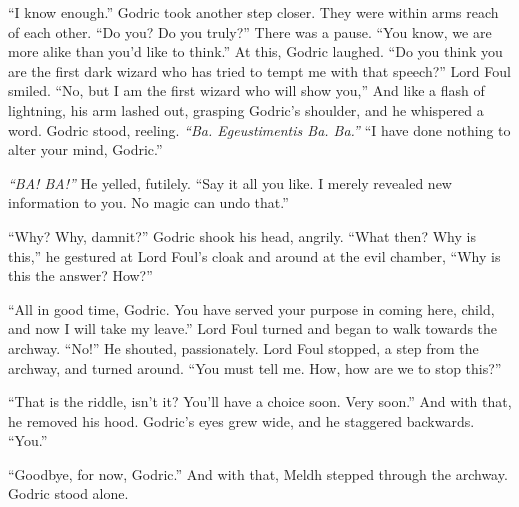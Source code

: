 “I know enough.” Godric took another step closer. They were within arms reach of each other.
\SmallVSpace
“Do you? Do you truly?” There was a pause. “You know, we are more alike than you’d like to think.”
\SmallVSpace
At this, Godric laughed. “Do you think you are the first dark wizard who has tried to tempt me with that speech?”
\SomeVSpace
Lord Foul smiled. “No, but I am the first wizard who will show you,” And like a flash of lightning, his arm lashed out, grasping Godric’s shoulder, and he whispered a word.
\simpleline
Godric stood, reeling. \emph{“Ba. Egeustimentis Ba. Ba.”}
\SomeVSpace
“I have done nothing to alter your mind, Godric.”

\emph{“BA! BA!”} He yelled, futilely.
\SmallVSpace
“Say it all you like. I merely revealed new information to you. No magic can undo that.”

“Why? Why, damnit?” Godric shook his head, angrily. “What then? Why is this,” he gestured at Lord Foul’s cloak and around at the evil chamber, “Why is this the answer? How?”

“All in good time, Godric. You have served your purpose in coming here, child, and now I will take my leave.” Lord Foul turned and began to walk towards the archway.
\SomeVSpace
“No!” He shouted, passionately. Lord Foul stopped, a step from the archway, and turned around. “You must tell me. How, how are we to stop this?”

“That is the riddle, isn’t it? You’ll have a choice soon. Very soon.” And with that, he removed his hood.
\SmallVSpace
Godric’s eyes grew wide, and he staggered backwards. “You.”

“Goodbye, for now, Godric.” And with that, Meldh stepped through the archway.
\SomeVSpace
Godric stood alone.